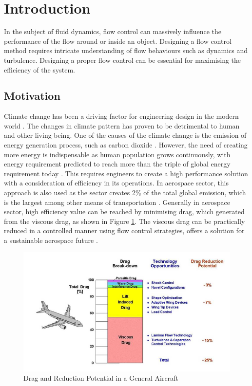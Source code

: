 \section{Introduction} 
\label{sec:intro}
In the subject of fluid dynamics, flow control can massively influence the performance of the flow around or inside an object. Designing a flow control method requires intricate understanding of flow behaviours such as dynamics and turbulence. Designing a proper flow control can be essential for maximising the efficiency of the system.


\subsection{Motivation}
\label{sec:motivation}
Climate change has been a driving factor for engineering design in the modern world \cite{Douglas2017}. The changes in climate pattern has proven to be detrimental to human and other living being. One of the causes of the climate change is the emission of energy generation process, such as carbon dioxide \cite{Met_Officend}. However, the need of creating more energy is indispensable as human population grows continuously, with energy requirement predicted to reach more than the triple of global energy requirement today \cite{IRENA2023}. This requires engineers to create a high performance solution with a consideration of efficiency in its operations. In aerospace sector, this approach is also used as the sector creates 2\% of the total global emission, which is the largest among other means of transportation \cite{Iea2023}. Generally in aerospace sector, high efficiency value can be reached by minimising drag, which generated from the viscous drag, as shown in Figure \ref{fig:B737}.
The viscous drag can be practically reduced in a controlled manner using flow control strategies, offers a solution for a sustainable aerospace future \cite{Abbas2017}.

\begin{figure}[ht]
    \centering
    \includegraphics[width=0.75\linewidth]{Figures/B737Drag.png}
    \caption{Drag and Reduction Potential in a General Aircraft~\cite{Abbas2017}}
    \label{fig:B737}
\end{figure}



